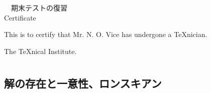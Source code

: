 \documentclass[fleqn]{jsarticle}
\begin{document}
\begin{center}
　期末テストの復習\\[.75cm] Certificate
\end{center}
\noindent This is to certify that Mr. N. O. Vice has undergone a \TeX nician.
\begin{flushright}
  The \TeX nical Institute.
\end{flushright}
  \setcounter{section}{1}
\section{}
  \setcounter{subsection}{5}
    \subsection{解の存在と一意性、ロンスキアン
 }
\end{document}
